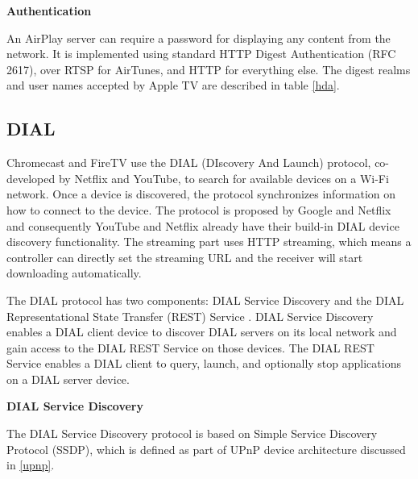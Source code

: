\textbf{Authentication}

An AirPlay server can require a password for displaying any content from the 
network. It is implemented using standard HTTP Digest Authentication (RFC 2617), 
over RTSP for AirTunes, and HTTP for everything else. The digest realms and 
user names accepted by Apple TV are described in table \ref{hda}. 

\begin{table}[htb] 
\caption{AirPlay HTTP Digest Authentication \label{hda}} 
\begin{center} 
\end{center} 
\end{table} 

\subsection{DIAL\label{2_2_4}} 
Chromecast and FireTV use the DIAL \cite{dial} (DIscovery And Launch) protocol,
co-developed by Netflix and YouTube, to search for available devices on a Wi-Fi network. 
Once a device is discovered, the protocol synchronizes information on how to 
connect to the device. The protocol is proposed by Google and Netflix and consequently 
YouTube and Netflix already have their build-in DIAL device discovery
functionality. The streaming part uses HTTP streaming, which means a controller can directly set the 
streaming URL and the receiver will start downloading automatically.

The DIAL protocol has two components: DIAL Service Discovery and the DIAL 
Representational State Transfer (REST) Service \cite{dial}. DIAL Service
Discovery enables a DIAL client device to discover DIAL servers on its local network and gain
access to the DIAL REST Service on those devices. The DIAL REST Service enables
a DIAL client to query, launch, and optionally stop applications on a DIAL
server device.

\textbf{DIAL Service Discovery}

The DIAL Service Discovery protocol is based on Simple Service Discovery 
Protocol (SSDP), which is defined as part of UPnP device architecture discussed 
in \ref{upnp}.

